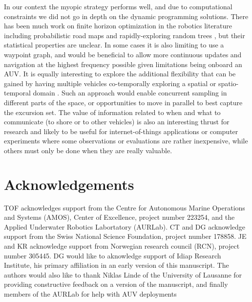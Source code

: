 \documentclass[aoas]{imsart}
\begin{document}
In our context the myopic strategy performs well, and due to
computational constraints we did not go in depth on the dynamic
programming solutions. There has been much work on finite horizon
optimization in the robotics literature including probabilistic road
maps and rapidly-exploring random trees \citep{karaman2011sampling},
but their statistical properties are unclear.  In some cases it is
also limiting to use a waypoint graph, and would be beneficial to
allow more continuous updates and navigation at the highest frequency
possible given limitations being onboard an AUV.  It is equally
interesting to explore the additional flexibility that can be gained
by having multiple vehicles co-temporally exploring a spatial or
spatio-temporal domain \citep{ferreira2019advancing}. Such an approach
would enable concurrent sampling in different parts of the space, or
opportunities to move in parallel to best capture the excursion set.
The value of information related to when and what to communicate (to
shore or to other vehicles) is also an interesting thrust for research
and likely to be useful for internet-of-things applications or
computer experiments where some observations or evaluations are rather
inexpensive, while others must only be done when they are really
valuable.



\section*{Acknowledgements}

TOF acknowledges support from the Centre for Autonomous Marine
Operations and Systems (AMOS), Center of Excellence, project number
223254, and the Applied Underwater Robotics Labortatory (AURLab). CT
and DG acknowledge support from the Swiss National Science Foundation,
project number 178858. JE and KR acknowledge support from Norwegian
research council (RCN), project number 305445. DG would like to
aknowledge support of Idiap Research Institute, his primary affiliation in an early version of this manuscript. The authors would also like to thank Niklas Linde of the University of Lausanne for providing constructive feedback on a version of the manuscript, and finally members of the AURLab for help with AUV deployments
\end{document}
